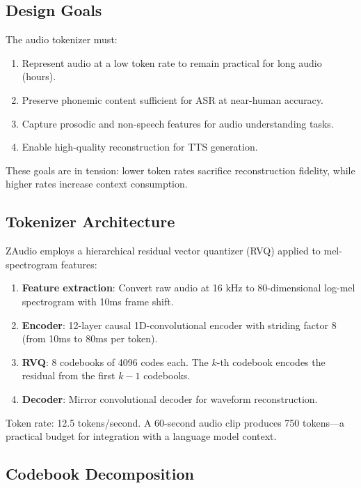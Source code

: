 \documentclass[11pt,a4paper]{article}
\begin{document}
\subsection{Design Goals}

The audio tokenizer must:
\begin{enumerate}
  \item Represent audio at a low token rate to remain practical for long audio (hours).
  \item Preserve phonemic content sufficient for ASR at near-human accuracy.
  \item Capture prosodic and non-speech features for audio understanding tasks.
  \item Enable high-quality reconstruction for TTS generation.
\end{enumerate}

These goals are in tension: lower token rates sacrifice reconstruction fidelity, while higher rates increase context consumption.

\subsection{Tokenizer Architecture}

ZAudio employs a hierarchical residual vector quantizer (RVQ) applied to mel-spectrogram features:

\begin{enumerate}
  \item \textbf{Feature extraction}: Convert raw audio at 16 kHz to 80-dimensional log-mel spectrogram with 10ms frame shift.
  \item \textbf{Encoder}: 12-layer causal 1D-convolutional encoder with striding factor 8 (from 10ms to 80ms per token).
  \item \textbf{RVQ}: 8 codebooks of 4096 codes each. The $k$-th codebook encodes the residual from the first $k-1$ codebooks.
  \item \textbf{Decoder}: Mirror convolutional decoder for waveform reconstruction.
\end{enumerate}

Token rate: 12.5 tokens/second. A 60-second audio clip produces 750 tokens—a practical budget for integration with a language model context.

\subsection{Codebook Decomposition}
\end{document}
